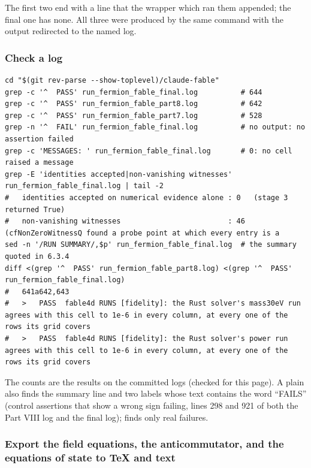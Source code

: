 The first two end with a line  that the wrapper which ran them appended; the final one has none. All three were produced by the same command with the output redirected to the named log.

\subsubsection{Check a log}
\label{sec:6.3.5}

\begin{Verbatim}
cd "$(git rev-parse --show-toplevel)/claude-fable"
grep -c '^  PASS' run_fermion_fable_final.log          # 644
grep -c '^  PASS' run_fermion_fable_part8.log          # 642
grep -c '^  PASS' run_fermion_fable_part7.log          # 528
grep -n '^  FAIL' run_fermion_fable_final.log          # no output: no assertion failed
grep -c 'MESSAGES: ' run_fermion_fable_final.log       # 0: no cell raised a message
grep -E 'identities accepted|non-vanishing witnesses' run_fermion_fable_final.log | tail -2
#   identities accepted on numerical evidence alone : 0   (stage 3 returned True)
#   non-vanishing witnesses                         : 46   (cfNonZeroWitnessQ found a probe point at which every entry is a
sed -n '/RUN SUMMARY/,$p' run_fermion_fable_final.log  # the summary quoted in 6.3.4
diff <(grep '^  PASS' run_fermion_fable_part8.log) <(grep '^  PASS' run_fermion_fable_final.log)
#   641a642,643
#   >   PASS  fable4d RUNS [fidelity]: the Rust solver's mass30eV run agrees with this cell to 1e-6 in every column, at every one of the rows its grid covers
#   >   PASS  fable4d RUNS [fidelity]: the Rust solver's power run agrees with this cell to 1e-6 in every column, at every one of the rows its grid covers
\end{Verbatim}

The counts are the results on the committed logs (checked for this page). A plain  also finds the summary line  and two  labels whose text contains the word ``FAILS'' (control assertions that show a wrong sign failing, lines 298 and 921 of both the Part VIII log and the final log);  finds only real failures.

\subsubsection{Export the field equations, the anticommutator, \texorpdfstring{}{J} and the equations of state to TeX and text}
\label{sec:6.3.6}

